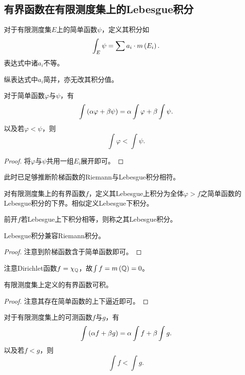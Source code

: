 \documentclass{ctexrep}
\begin{document}
  \subsection{有界函数在有限测度集上的Lebesgue积分}
  \begin{definition}
    对于有限测度集$E$上的简单函数$\psi$，定义其积分如
    \[ \int_E\psi = \sum a_i\cdot m\left(E_i\right). \]
    表达式中诸$a_i$不等。
  \end{definition}
  \begin{lemma}
    纵表达式中$a_i$简并，亦无改其积分值。
  \end{lemma}
  \begin{proposition}[积分的线性与单调性]
    对于简单函数$\varphi$与$\psi$，有
    \[ \int\left(\alpha\varphi+\beta\psi\right) = \alpha\int\varphi + \beta\int\psi. \]
    以及若$\varphi<\psi$，则
    \[ \int\varphi < \int\psi. \]
  \end{proposition}
  \begin{proof}
    将$\varphi$与$\psi$共用一组$E_i$展开即可。
  \end{proof}
  此时已足够推断阶梯函数的Riemann与Lebesgue积分相符。
  \begin{definition}
    对有限测度集上的有界函数$f$，定义其Lebesgue上积分为全体$\varphi>f$之简单函数的Lebesgue积分的下界。相似定义Lebesgue下积分。
  \end{definition}
  \begin{definition}
    前开$f$若Lebesgue上下积分相等，则称之其Lebesgue积分。
  \end{definition}
  \begin{theorem}
    Lebesgue积分兼容Riemann积分。
  \end{theorem}
  \begin{proof}
    注意到阶梯函数含于简单函数即可。
  \end{proof}
  \begin{ex}
    注意Dirichlet函数$f=\chi_{\mathbb{Q}}$，故$\int f = m\left(\mathbb{Q}\right)=0$。
  \end{ex}
  \begin{theorem}
    \label{thm:intable}
    有限测度集上定义的有界函数可积。
  \end{theorem}
  \begin{proof}
    注意其存在简单函数的上下逼近即可。
  \end{proof}
  \begin{proposition}[积分的线性与单调性]
    对于有限测度集上的可测函数$f$与$g$，有
    \[ \int\left(\alpha f+\beta g\right) = \alpha\int f + \beta\int g. \]
    以及若$f<g$，则
    \[ \int f < \int g. \]
  \end{proposition}
\end{document}
